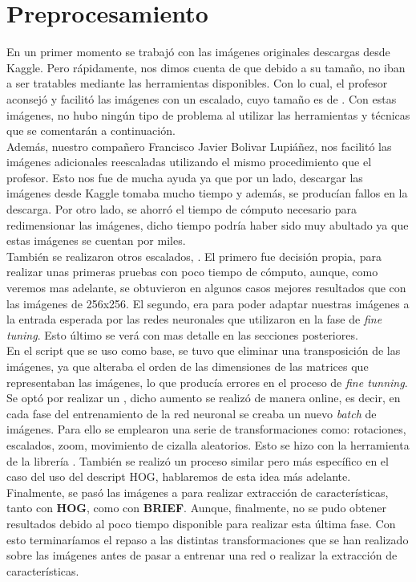 \section{Preprocesamiento}

En un primer momento se trabajó con las imágenes originales descargas desde Kaggle. Pero rápidamente, nos dimos cuenta de que debido a su tamaño, no iban a ser tratables mediante las herramientas disponibles. Con lo cual, el profesor aconsejó y facilitó las imágenes con un escalado, cuyo tamaño es de . Con estas imágenes, no hubo ningún tipo de problema al utilizar las herramientas y técnicas que se comentarán a continuación.\\

Además, nuestro compañero Francisco Javier Bolivar Lupiáñez, nos facilitó las imágenes adicionales reescaladas utilizando el mismo procedimiento que el profesor. Esto nos fue de mucha ayuda ya que por un lado, descargar las imágenes desde Kaggle tomaba mucho tiempo y además, se producían fallos en la descarga. Por otro lado, se ahorró el tiempo de cómputo necesario para redimensionar las imágenes, dicho tiempo podría haber sido muy abultado ya que estas imágenes se cuentan por miles.\\

También se realizaron otros escalados, . El primero fue decisión propia, para realizar unas primeras pruebas con poco tiempo de cómputo, aunque, como veremos mas adelante, se obtuvieron en algunos casos mejores resultados que con las imágenes de 256x256. El segundo, era para poder adaptar nuestras imágenes a la entrada esperada por las redes neuronales que utilizaron en la fase de \textit{fine tuning}. Esto último se verá con mas detalle en las secciones posteriores.\\

En el script que se uso como base, se tuvo que eliminar una transposición de las imágenes, ya que alteraba el orden de las dimensiones de las matrices que representaban las imágenes, lo que producía errores en el proceso de \textit{fine tunning}.\\

Se optó por realizar un , dicho aumento se realizó de manera online, es decir, en cada fase del entrenamiento de la red neuronal se creaba un nuevo \textit{batch} de imágenes. Para ello se emplearon una serie de transformaciones como: rotaciones, escalados, zoom, movimiento de cizalla aleatorios. Esto se hizo con la herramienta  de la librería . También se realizó un proceso similar pero más específico en el caso del uso del descript HOG, hablaremos de esta idea más adelante.\\

Finalmente, se pasó las imágenes a  para realizar extracción de características, tanto con \textbf{HOG}, como con \textbf{BRIEF}. Aunque, finalmente, no se pudo obtener resultados debido al poco tiempo disponible para realizar esta última fase. Con esto terminaríamos el repaso a las distintas transformaciones que se han realizado sobre las imágenes antes de pasar a entrenar una red o realizar la extracción de características.
